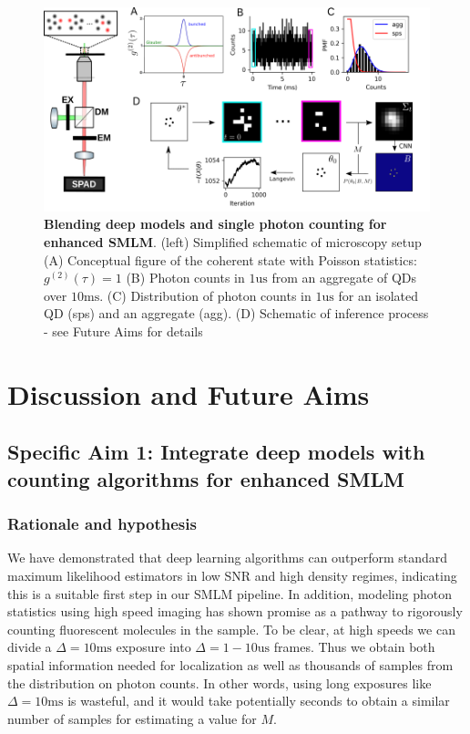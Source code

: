 \documentclass{ucetd}
\begin{document}
\begin{figure}
\begin{center}
\includegraphics[width=17cm]{SPAD.png}
\end{center}
\caption{\textbf{Blending deep models and single photon counting for enhanced SMLM}. (left) Simplified schematic of microscopy setup (A) Conceptual figure of the coherent state with Poisson statistics: $g^{(2)}(\tau)=1$ (B) Photon counts in $1\mathrm{us}$ from an aggregate of QDs over $10\mathrm{ms}$. (C) Distribution of photon counts in $1\mathrm{us}$ for an isolated QD (sps) and an aggregate (agg). (D) Schematic of inference process - see Future Aims for details}
\end{figure}

\clearpage
\section{Discussion and Future Aims}

\subsection{Specific Aim 1: Integrate deep models with counting algorithms for enhanced SMLM}

\subsubsection{Rationale and hypothesis}

We have demonstrated that deep learning algorithms can outperform standard maximum likelihood estimators in low SNR and high density regimes, indicating this is a suitable first step in our SMLM pipeline. In addition, modeling photon statistics using high speed imaging has shown promise as a pathway to rigorously counting fluorescent molecules in the sample. To be clear, at high speeds we can divide a $\Delta=10\mathrm{ms}$ exposure into $\Delta=1-10\mathrm{us}$ frames. Thus we obtain both spatial information needed for localization as well as thousands of samples from the distribution on photon counts. In other words, using long exposures like $\Delta=10\mathrm{ms}$ is wasteful, and it would take potentially seconds to obtain a similar number of samples for estimating a value for $M$.
\end{document}
